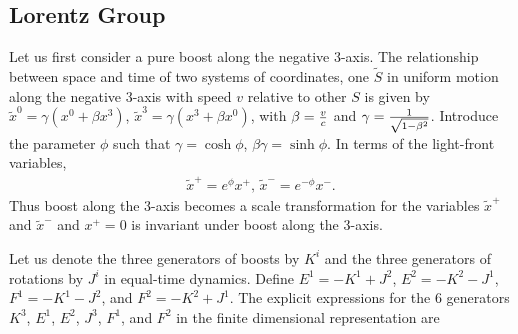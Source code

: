 \documentclass[12pt,a4paper]{report}
\begin{document}
\subsection{Lorentz Group
}
Let us first consider a pure boost along the negative 3-axis. The
relationship between space and time of two systems of coordinates, one
${\tilde S}$ in uniform motion along the negative 3-axis with speed $v$
relative to other $S$ is given by
${\tilde x}^0 = \gamma (x^0 + \beta x^3)$,  ${\tilde x}^3 = 
\gamma (x^3 + \beta x^0)$, with $\beta ={ v \over c}$ and $\gamma 
= { 1 \over \sqrt{1 - \beta^2}}$.
Introduce the parameter $ \phi$ such that $ \gamma = \cosh \phi$, $ \beta
\gamma = \sinh \phi$. In terms of the light-front variables, \cite{Harindranath}
\begin{align}
    {\tilde x}^+ = e^\phi x^+, \, {\tilde x}^{-} = e^{- \phi} x^-.
\end{align}
Thus boost along the 3-axis becomes a scale transformation for the variables
${\tilde x}^+$ and ${\tilde x}^-$ and $x^+=0$ is invariant under boost along
the 3-axis. 

Let us denote the three generators of boosts by $K^i$ and the three
generators of rotations by $J^i$ in equal-time dynamics.
Define $E^1= -K^1 + J^2$, $ E^2=-K^2-J^1$, $ F^1=-K^1-J^2$, and
$F^2=-K^2+J^1$. The explicit expressions for the 6 generators $K^3$, $E^1$,
$E^2$, $J^3$, $F^1$, and $F^2$  in the finite dimensional representation are
\end{document}
